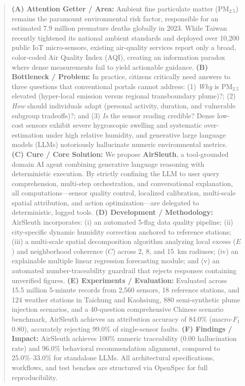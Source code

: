 \documentclass[conference]{IEEEtran}
\begin{document}
\begin{abstract}
\textbf{(A) Attention Getter / Area:} Ambient fine particulate matter ($\text{PM}_{2.5}$) remains the paramount environmental risk factor, responsible for an estimated 7.9 million premature deaths globally in 2023. While Taiwan recently tightened its national ambient standards and deployed over 10,200 public IoT micro-sensors, existing air-quality services report only a broad, color-coded Air Quality Index (AQI), creating an information paradox where dense measurements fail to yield actionable guidance.
\textbf{(B) Bottleneck / Problem:} In practice, citizens critically need answers to three questions that conventional portals cannot address: (1) \textit{Why} is $\text{PM}_{2.5}$ elevated (hyper-local emission versus regional transboundary plume)?; (2) \textit{How} should individuals adapt (personal activity, duration, and vulnerable subgroup tradeoffs)?; and (3) \textit{Is} the sensor reading credible? Dense low-cost sensors exhibit severe hygroscopic swelling and systematic over-estimation under high relative humidity, and generative large language models (LLMs) notoriously hallucinate numeric environmental metrics.
\textbf{(C) Cure / Core Solution:} We propose \textbf{AirSleuth}, a tool-grounded domain AI agent combining generative language reasoning with deterministic execution. By strictly confining the LLM to user query comprehension, multi-step orchestration, and conversational explanation, all computations---sensor quality control, localized calibration, multi-scale spatial attribution, and action optimization---are delegated to deterministic, logged tools.
\textbf{(D) Development / Methodology:} AirSleuth incorporates: (i) an automated 5-flag data quality pipeline; (ii) city-specific dynamic humidity correction anchored to reference stations; (iii) a multi-scale spatial decomposition algorithm analyzing local excess ($E$) and neighborhood coherence ($C$) across 2, 8, and 15~km radiuses; (iv) an explainable multiple linear regression forecasting module; and (v) an automated number-traceability guardrail that rejects responses containing unverified figures.
\textbf{(E) Experiments / Evaluation:} Evaluated across 15.5 million 5-minute records from 2,560 sensors, 18 reference stations, and 124 weather stations in Taichung and Kaohsiung, 880 semi-synthetic plume injection scenarios, and a 40-question comprehensive Chinese scenario benchmark, AirSleuth achieves an attribution accuracy of 84.0\% (macro-$F_1$ 0.80), accurately rejecting 99.0\% of single-sensor faults.
\textbf{(F) Findings / Impact:} AirSleuth achieves 100\% numeric traceability (0.00 hallucination rate) and 96.0\% behavioral recommendation alignment, compared to 25.0\%--33.0\% for standalone LLMs. All architectural specifications, workflows, and test benches are structured via OpenSpec for full reproducibility.
\end{abstract}
\end{document}
